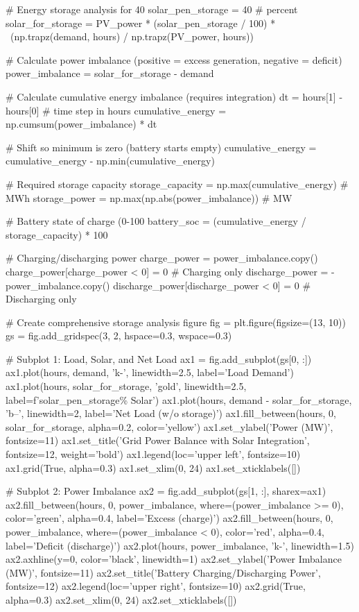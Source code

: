 \documentclass[11pt,a4paper]{article}
\begin{document}
\begin{pycode}
# Energy storage analysis for 40%
solar_pen_storage = 40  # percent
solar_for_storage = PV_power * (solar_pen_storage / 100) * \
                    (np.trapz(demand, hours) / np.trapz(PV_power, hours))

# Calculate power imbalance (positive = excess generation, negative = deficit)
power_imbalance = solar_for_storage - demand

# Calculate cumulative energy imbalance (requires integration)
dt = hours[1] - hours[0]  # time step in hours
cumulative_energy = np.cumsum(power_imbalance) * dt

# Shift so minimum is zero (battery starts empty)
cumulative_energy = cumulative_energy - np.min(cumulative_energy)

# Required storage capacity
storage_capacity = np.max(cumulative_energy)  # MWh
storage_power = np.max(np.abs(power_imbalance))  # MW

# Battery state of charge (0-100%
battery_soc = (cumulative_energy / storage_capacity) * 100

# Charging/discharging power
charge_power = power_imbalance.copy()
charge_power[charge_power < 0] = 0  # Charging only
discharge_power = -power_imbalance.copy()
discharge_power[discharge_power < 0] = 0  # Discharging only

# Create comprehensive storage analysis figure
fig = plt.figure(figsize=(13, 10))
gs = fig.add_gridspec(3, 2, hspace=0.3, wspace=0.3)

# Subplot 1: Load, Solar, and Net Load
ax1 = fig.add_subplot(gs[0, :])
ax1.plot(hours, demand, 'k-', linewidth=2.5, label='Load Demand')
ax1.plot(hours, solar_for_storage, 'gold', linewidth=2.5, label=f'{solar_pen_storage}\% Solar')
ax1.plot(hours, demand - solar_for_storage, 'b--', linewidth=2, label='Net Load (w/o storage)')
ax1.fill_between(hours, 0, solar_for_storage, alpha=0.2, color='yellow')
ax1.set_ylabel('Power (MW)', fontsize=11)
ax1.set_title('Grid Power Balance with Solar Integration', fontsize=12, weight='bold')
ax1.legend(loc='upper left', fontsize=10)
ax1.grid(True, alpha=0.3)
ax1.set_xlim(0, 24)
ax1.set_xticklabels([])

# Subplot 2: Power Imbalance
ax2 = fig.add_subplot(gs[1, :], sharex=ax1)
ax2.fill_between(hours, 0, power_imbalance, where=(power_imbalance >= 0),
                  color='green', alpha=0.4, label='Excess (charge)')
ax2.fill_between(hours, 0, power_imbalance, where=(power_imbalance < 0),
                  color='red', alpha=0.4, label='Deficit (discharge)')
ax2.plot(hours, power_imbalance, 'k-', linewidth=1.5)
ax2.axhline(y=0, color='black', linewidth=1)
ax2.set_ylabel('Power Imbalance (MW)', fontsize=11)
ax2.set_title('Battery Charging/Discharging Power', fontsize=12)
ax2.legend(loc='upper right', fontsize=10)
ax2.grid(True, alpha=0.3)
ax2.set_xlim(0, 24)
ax2.set_xticklabels([])


\end{pycode}
\end{document}
